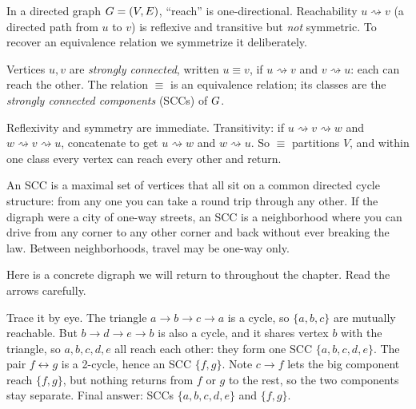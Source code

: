 In a directed graph $G=(V,E)$, ``reach'' is one-directional. Reachability $u \rightsquigarrow v$ (a directed path from $u$ to $v$) is reflexive and transitive but \emph{not} symmetric. To recover an equivalence relation we symmetrize it deliberately.

\begin{definition}
\label{ch05:def-scc}
Vertices $u,v$ are \emph{strongly connected}, written $u \equiv v$, if $u \rightsquigarrow v$ and $v \rightsquigarrow u$: each can reach the other. The relation $\equiv$ is an equivalence relation; its classes are the \emph{strongly connected components} (SCCs) of $G$.
\end{definition}

Reflexivity and symmetry are immediate. Transitivity: if $u \rightsquigarrow v \rightsquigarrow w$ and $w \rightsquigarrow v \rightsquigarrow u$, concatenate to get $u \rightsquigarrow w$ and $w \rightsquigarrow u$. So $\equiv$ partitions $V$, and within one class every vertex can reach every other and return.

\begin{intuitionbox}
An SCC is a maximal set of vertices that all sit on a common directed cycle structure: from any one you can take a round trip through any other. If the digraph were a city of one-way streets, an SCC is a neighborhood where you can drive from any corner to any other corner and back without ever breaking the law. Between neighborhoods, travel may be one-way only.
\end{intuitionbox}

Here is a concrete digraph we will return to throughout the chapter. Read the arrows carefully.

\begin{center}
\end{center}

Trace it by eye. The triangle $a\to b\to c\to a$ is a cycle, so $\{a,b,c\}$ are mutually reachable. But $b\to d\to e\to b$ is also a cycle, and it shares vertex $b$ with the triangle, so $a,b,c,d,e$ all reach each other: they form one SCC $\{a,b,c,d,e\}$. The pair $f\leftrightarrow g$ is a 2-cycle, hence an SCC $\{f,g\}$. Note $c\to f$ lets the big component reach $\{f,g\}$, but nothing returns from $f$ or $g$ to the rest, so the two components stay separate. Final answer: SCCs $\{a,b,c,d,e\}$ and $\{f,g\}$.

